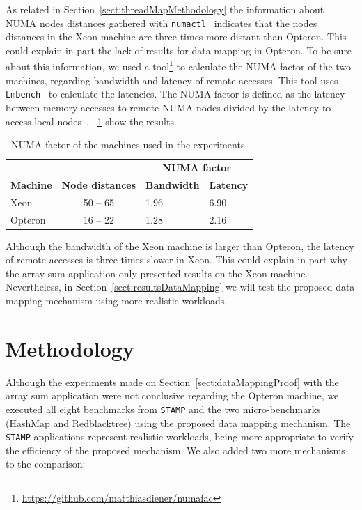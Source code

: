 As related in Section~\ref{sect:threadMapMethodology} the information about NUMA nodes distances gathered with \texttt{numactl}~\cite{libnuma} indicates that the nodes distances in the Xeon machine are three times more distant than Opteron. This could explain in part the lack of results for data mapping in Opteron. To be sure about this information, we used a tool\footnote{\url{https://github.com/matthiasdiener/numafac}} to calculate the NUMA factor of the two machines, regarding bandwidth and latency of remote accesses. This tool uses \texttt{Lmbench}~\cite{lmbench} to calculate the latencies. The NUMA factor is defined as the latency between memory accesses to remote NUMA nodes divided by the latency to access local nodes~\cite{Mariano:2016}. \tablename~\ref{tab:NodeDistances} show the results. 
\begin{table}[h!tb]
	\centering
	\caption{NUMA factor of the machines used in the experiments.}
	\label{tab:NodeDistances}
	\begin{tabular}{@{}lcll@{}}
		\toprule
		&                         & \multicolumn{2}{c}{\textbf{NUMA factor}} \\ \cmidrule{3-4}
		\textbf{Machine} & \textbf{Node distances} & \textbf{Bandwidth}   & \textbf{Latency}  \\ \midrule
		Xeon             & 50 -- 65                & 1.96                 & 6.90              \\
		Opteron          & 16 -- 22                & 1.28                 & 2.16              \\ \bottomrule
	\end{tabular}
\end{table}
Although the bandwidth of the Xeon machine is larger than Opteron, the latency of remote accesses is three times slower in Xeon. This could explain in part why the array sum application only presented results on the Xeon machine. Nevertheless, in Section~\ref{sect:resultsDataMapping} we will test the proposed data mapping mechanism using more realistic workloads.


\section{Methodology}

Although the experiments made on Section~\ref{sect:dataMappingProof} with the array sum application were not conclusive regarding the Opteron machine, we executed all eight benchmarks from \texttt{STAMP} and the two micro-benchmarks (HashMap and Redblacktree) using the proposed data mapping mechanism. The \texttt{STAMP} applications represent realistic workloads, being more appropriate to verify the efficiency of the proposed mechanism. We also added two more mechanisms to the comparison:

